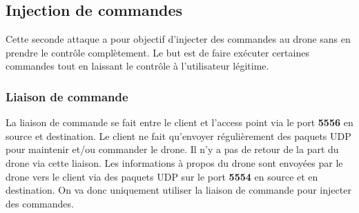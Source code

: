 \subsection{Injection de commandes}
Cette seconde attaque a pour objectif d'injecter des commandes au drone sans en prendre le contrôle complètement. Le but est de faire exécuter certaines commandes tout en laissant le contrôle à l'utilisateur légitime.

\subsubsection{Liaison de commande}
La liaison de commande se fait entre le client et l'access point via le port \textbf{5556} en source et destination. Le client ne fait qu'envoyer régulièrement des paquets UDP pour maintenir et/ou commander le drone. Il n'y a pas de retour de la part du drone via cette liaison. Les informations à propos du drone sont envoyées par le drone vers le client via des paquets UDP sur le port \textbf{5554} en source et en destination. On va donc uniquement utiliser la liaison de commande pour injecter des commandes.

